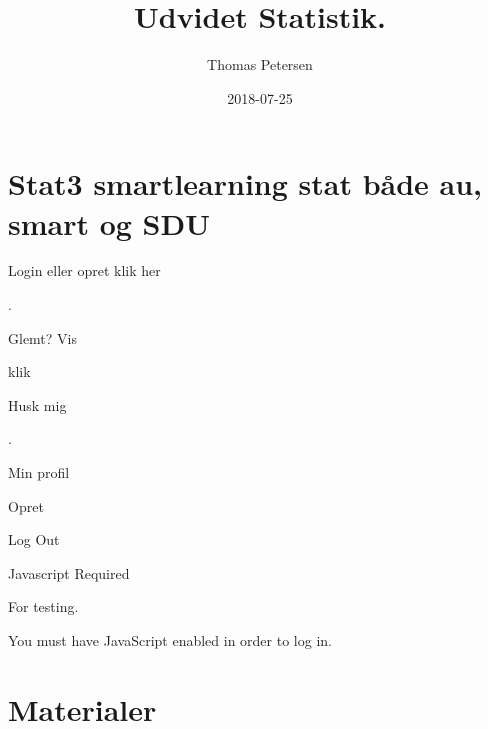 \documentclass[]{book}
\title{Udvidet Statistik.}
\author{Thomas Petersen}
\date{2018-07-25}
\begin{document}
\maketitle

{
\setcounter{tocdepth}{1}
\tableofcontents
}
\hypertarget{stat3-smartlearning-stat-bade-au-smart-og-sdu}{%
\chapter*{Stat3 smartlearning stat både au, smart og
SDU}\label{stat3-smartlearning-stat-bade-au-smart-og-sdu}}

\hypertarget{Settings}{}

\hypertarget{TopBar}{}
\hypertarget{Sentry_label}{}
\protect\hypertarget{Sentry_label_span}{}{Login eller opret klik her}

\hypertarget{magicGroup}{}
\hypertarget{messages}{}
.

\hypertarget{Sentry_emailDiv}{}
{ }

\hypertarget{Sentry_passwordDiv}{}
{ }

\hypertarget{Sentry_HIDpasswordDiv}{}
{ }

\hypertarget{unHideDiv}{}
\protect\hypertarget{forgotSpan}{}{Glemt?}
\protect\hypertarget{unHideSpan}{}{Vis}

\hypertarget{buttonDiv}{}
klik

\hypertarget{psistDiv}{}
 \protect\hypertarget{psistSpan}{}{Husk mig}

\hypertarget{goInside}{}
\protect\hypertarget{goInsideSpan}{}{.}

\hypertarget{myProfile}{}
Min profil

\hypertarget{Tilmeld}{}
Opret

\hypertarget{logOut}{}
{Log Out}

\hypertarget{xbox}{}

\hypertarget{Sentry_noJSLogin}{}
{Javascript Required}

\hypertarget{Sentry_loggingIn}{}

\hypertarget{Sentry_In}{}
For testing.

You must have JavaScript enabled in order to log in.

\hypertarget{materialer}{%
\chapter{Materialer}\label{materialer}}
\end{document}
